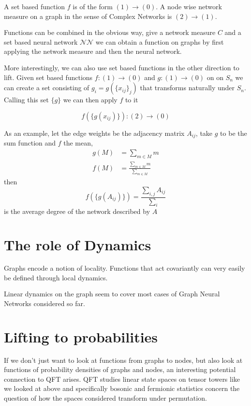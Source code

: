 \documentclass[reprint,twocolumn,amsmath,amssymb,aps]{revtex4-1}
\newcommand{\NN}{\mathcal{NN}}
\begin{document}
A set based function $f$ is of the form $(1) \rightarrow (0)$. A node wise network measure on a graph in the sense of Complex Networks is $(2) \rightarrow (1)$.

Functions can be combined in the obvious way, give a network measure $C$ and a set based neural network $\NN$ we can obtain a function on graphs by first applying the network measure and then the neural network.

More interestingly, we can also use set based functions in the other direction to lift. Given set based functions $f: (1) \rightarrow (0)$  and $g: (1) \rightarrow (0)$ on  on $S_{n}$ we can create a set consisting of $g_i = g(\{x_{ij}\}_{j})$ that transforms naturally under $S_n$. Calling this set $\{g\}$ we can then apply $f$ to it

\begin{equation*}
f(\{g(x_{ij})\}) : (2) \rightarrow (0)
\end{equation*}

As an example, let the edge weights be the adjacency matrix $A_{ij}$, take $g$ to be the sum function and $f$ the mean,
\begin{align}
g(M) &= \sum_{m \in M} m\\
f(M) &= \frac{\sum_{m \in M} m}{\sum_{m \in M}}
\end{align}
then 
\begin{equation}
f(\{g(A_{ij})\}) = \frac{\sum_{i, j} A_{ij}}{\sum_{i}}
\end{equation}
is the average degree of the network described by $A$

\section{The role of Dynamics}

Graphs encode a notion of locality. Functions that act covariantly can very easily be defined through local dynamics.

Linear dynamics on the graph seem to cover most cases of Graph Neural Networks considered so far.

\section{Lifting to probabilities}

If we don't just want to look at functions from graphs to nodes, but also look at functions of probability densities of graphs and nodes, an interesting potential connection to QFT arises. QFT studies linear state spaces on tensor towers like we looked at above and specifically bosonic and fermionic statistics concern the question of how the spaces considered transform under permutation.
\end{document}
